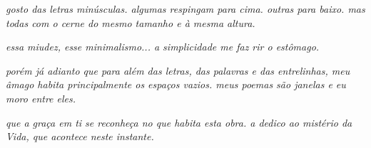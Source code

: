 \emph{gosto das letras minúsculas. algumas respingam para cima. outras para baixo. mas todas com o cerne do mesmo tamanho e à mesma altura.}

\emph{essa miudez, esse minimalismo... a simplicidade me faz rir o estômago.}

\emph{porém já adianto que para além das letras, das palavras e das entrelinhas, meu âmago habita principalmente os espaços vazios. meus poemas são janelas e eu moro entre eles.}

\emph{que a graça em ti se reconheça no que habita esta obra. a dedico ao mistério da Vida, que acontece neste instante.}
